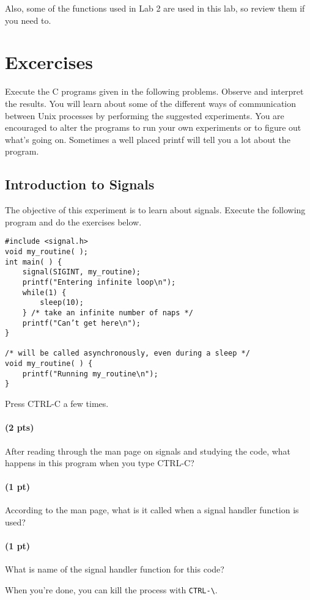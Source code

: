 \documentclass[letterpaper,10pt]{article}
\begin{document}
\noindent Also, some of the functions used in Lab 2 are used in this lab, so review them if you need to.

\section{Excercises}
Execute the C programs given in the following problems. Observe and interpret the results. You will
learn about some of the different ways of communication between Unix processes by performing the
suggested experiments. You are encouraged to alter the programs to run your own experiments or to
figure out what's going on. Sometimes a well placed printf will tell you a lot about the program.

\subsection{Introduction to Signals}
The objective of this experiment is to learn about signals. Execute the following program and
do the exercises below.

\begin{verbatim}
#include <signal.h>
void my_routine( );
int main( ) {
    signal(SIGINT, my_routine);
    printf("Entering infinite loop\n");
    while(1) {
        sleep(10);
    } /* take an infinite number of naps */
    printf("Can’t get here\n");
}

/* will be called asynchronously, even during a sleep */
void my_routine( ) {
    printf("Running my_routine\n");
}
\end{verbatim}

Press CTRL-C a few times.
\paragraph{(2 pts)} After reading through the man page on signals and studying the code, what
happens in this program when you type CTRL-C?
\paragraph{(1 pt)} According to the man page, what is it called when a signal handler function is used?
\paragraph{(1 pt)} What is name of the signal handler function for this code?

\noindent When you're done, you can kill the process with \verb+CTRL-\+.
\end{document}
